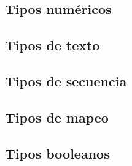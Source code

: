 \subsection{Tipos numéricos}
\subsection{Tipos de texto}
\subsection{Tipos de secuencia}
\subsection{Tipos de mapeo}
\subsection{Tipos booleanos}
